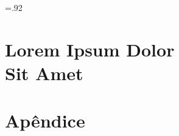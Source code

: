 
\setcounter{secnumdepth}{-2}
\setcounter{tocdepth}{0}


\pagebreak
\begingroup \footnotesize \parindent0pt \parskip 5pt \thispagestyle{empty} \vspace*{-0.5\textheight}\mbox{} \vfill
\baselineskip=.92\baselineskip

\endgroup

\pagebreak
{\begingroup\mbox{}\pagestyle{empty}
\pagestyle{empty} 
\tableofcontents*\clearpage\endgroup}

% 


\part[Lorem Ipsum Dolor Sit Amet]{Lorem Ipsum Dolor\\Sit Amet}








\part{Apêndice}



